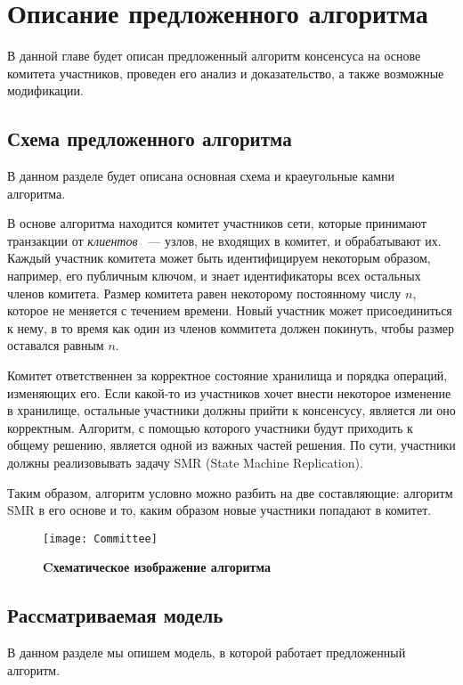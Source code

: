 
\chapter{Описание предложенного алгоритма}  \label{chapter2}
В данной главе будет описан предложенный алгоритм консенсуса на основе комитета участников, проведен его анализ и доказательство,
а также возможные модификации.

\section{Схема предложенного алгоритма}
В данном разделе будет описана основная схема и краеугольные камни алгоритма.

В основе алгоритма находится комитет участников сети, 
которые принимают транзакции от \textit{клиентов} ~--- узлов, не входящих в комитет, 
и обрабатывают их.
Каждый участник комитета может быть идентифицируем некоторым образом, например, его публичным ключом, и знает идентификаторы всех остальных членов комитета.
Размер комитета равен некоторому постоянному числу $n$, которое не меняется с течением времени. 
Новый участник может присоединиться к нему, в то время как один из членов коммитета должен покинуть, чтобы размер оставался равным $n$.

Комитет ответственнен за корректное состояние хранилища и порядка операций, изменяющих его.
Если какой-то из участников хочет внести некоторое изменение в хранилище, остальные участники должны прийти к консенсусу, является ли оно корректным. 
Алгоритм, с помощью которого участники будут приходить к общему решению, является одной из важных частей решения.  
По сути, участники должны реализовывать задачу SMR (State Machine Replication)\cite{Schneider:1990:IFS:98163.98167}.

Таким образом, алгоритм условно можно разбить на две составляющие: алгоритм SMR в его основе и то, каким образом новые участники попадают в комитет.

\begin{figure}[!h]
\texttt{[image: Committee]}
\caption{\textbf{Cхематическое изображение алгоритма}}
\label{fig:committee}
\end{figure}

\section{Рассматриваемая модель}
В данном разделе мы опишем модель, в которой работает предложенный алгоритм.

